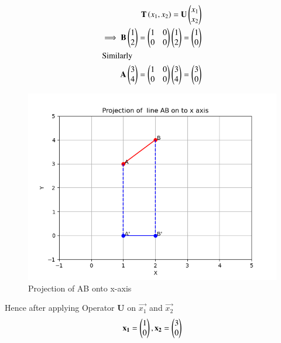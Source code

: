 \begin{align}
\textbf{T}\left(x_1, x_2\right) = \mathbf{U}\begin{pmatrix} x_1  \\ x_2\end{pmatrix}\\
\implies   \mathbf{B}\begin{pmatrix}1 \\ 2\end{pmatrix} =  \begin{pmatrix}1 & 0 \\ 0 & 0 \end{pmatrix} \begin{pmatrix}1 \\ 2\end{pmatrix} = \begin{pmatrix}1 \\ 0\end{pmatrix}\\
\intertext{Similarly}
\mathbf{A}\begin{pmatrix}3 \\ 4\end{pmatrix} =  \begin{pmatrix}1 & 0 \\ 0 & 0 \end{pmatrix} \begin{pmatrix}3 \\ 4\end{pmatrix} = \begin{pmatrix}3 \\ 0\end{pmatrix}
\end{align}

\begin{figure}[htb!]	
	\centering	
	\includegraphics[width=\columnwidth]{./solutions/3/2/1/a/Python_Code/projection.png}	
	\caption{Projection of AB onto x-axis}
	\label{eq:solutions/3/2/1/a/fig2}	
\end{figure}
Hence after  applying Operator \textbf{U} on $\vec{x_1}$ and $\vec{x_2}$
\begin{align}
\mathbf{x_1} = \begin{pmatrix}1\\0\end{pmatrix}, \mathbf{x_2} =\begin{pmatrix}3\\0\end{pmatrix}
\end{align}




